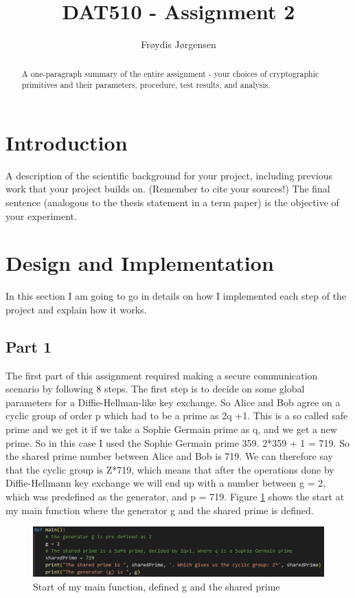 \documentclass[12pt, letterpaper]{article}
\title{DAT510 - Assignment 2}
\author{Fr\o ydis J\o rgensen}
\begin{document}
\begin{titlepage}
\maketitle
\end{titlepage}

\begin{abstract}
A one-paragraph summary of the entire assignment - your choices of cryptographic primitives
and their parameters, procedure, test results, and analysis.
\end{abstract}

\section*{Introduction}
A description of the scientific background for your project, including previous work that your
project builds on. (Remember to cite your sources!) The final sentence (analogous to the thesis
statement in a term paper) is the objective of your experiment.

\section*{Design and Implementation}
In this section I am going to go in details on how I implemented each step of the project and explain how it works.

\subsection*{Part 1}
The first part of this assignment required making a secure communication scenario by following 8 steps.
The first step is to decide on some global parameters for a Diffie-Hellman-like key exchange. So Alice and Bob agree on a cyclic group of order p which had to be a prime as 2q +1. This is a so called safe prime and we get it if we take a Sophie Germain prime as q, and we get a new prime. So in this case I used the Sophie Germain prime 359. 2*359 + 1 = 719. So the shared prime number between Alice and Bob is 719. We can therefore say that the cyclic group is Z*719, which means that after the operations done by Diffie-Hellmann key exchange we will end up with a number between g = 2, which was predefined as the generator, and p = 719. Figure \ref{fig:step1} shows the start at my main function where the generator g and the shared prime is defined.

\begin{figure}[H]
  \includegraphics[width=\linewidth]{code_snippets/step1.PNG}
  \caption{Start of my main function, defined g and the shared prime}
  \label{fig:step1}
\end{figure}
\end{document}
